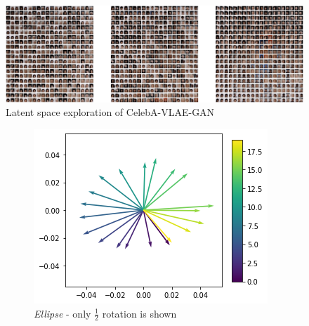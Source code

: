 \documentclass{beamer}
\begin{document}
\begin{frame}
\begin{figure}
\centering
\includegraphics[width=\textwidth]{images/latent_space_traversals/vlae_gan_celeba.png}
\caption[VLAE-GAN on CelebA: Latent Space Exploration]{Latent space exploration of CelebA-VLAE-GAN}
\end{figure}
\end{frame}
\begin{frame}
\begin{figure}
\centering
\begin{subfigure}{.3\textwidth}
\includegraphics[width=\textwidth]{images/latent_space_traversals/vae_dsprites_orientation_latent_space.png}
\caption{\textit{Ellipse} - only $\frac{1}{2}$ rotation is shown}
\end{subfigure}
\hfill
\begin{subfigure}{.3\textwidth}

\end{subfigure}
\end{figure}
\end{frame}
\end{document}
